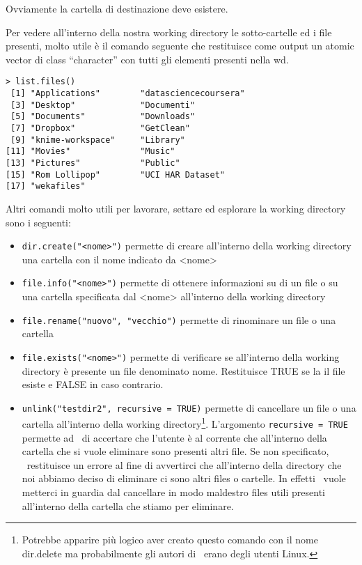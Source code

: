 Ovviamente la cartella di destinazione deve esistere.

Per vedere all'interno della nostra working directory le sotto-cartelle ed i file presenti, molto utile è il comando seguente che restituisce come output un atomic vector di class ``character'' con tutti gli elementi presenti nella wd.

\begin{lstlisting}
> list.files()
 [1] "Applications"        "datasciencecoursera"
 [3] "Desktop"             "Documenti"          
 [5] "Documents"           "Downloads"          
 [7] "Dropbox"             "GetClean"           
 [9] "knime-workspace"     "Library"            
[11] "Movies"              "Music"              
[13] "Pictures"            "Public"             
[15] "Rom Lollipop"        "UCI HAR Dataset"    
[17] "wekafiles"          
\end{lstlisting}


Altri comandi molto utili per lavorare, settare ed esplorare la working directory sono i seguenti:
\begin{itemize}

\item \lstinline!dir.create("<nome>")! permette di creare all'interno della working directory una cartella con il nome indicato da \textsf{<nome>}
\item \lstinline!file.info("<nome>")! permette di ottenere informazioni su di un file o su una cartella specificata dal \textsf{<nome>} all'interno della working directory
\item \lstinline!file.rename("nuovo", "vecchio")!  permette di rinominare un file o una cartella
\item \lstinline!file.exists("<nome>")! permette di verificare se all'interno della working directory è presente un file denominato \textsf{nome}. Restituisce \textsf{TRUE} se la il file esiste e \textsf{FALSE} in caso contrario.
\item \lstinline!unlink("testdir2", recursive = TRUE)! permette di cancellare un file o una cartella all'interno della working directory\footnote{Potrebbe apparire più logico aver creato questo comando con il nome \textsf{dir.delete} ma probabilmente gli autori di \erre\ erano degli utenti Linux.}. L'argomento \lstinline!recursive = TRUE! permette ad \erre\ di accertare che l'utente è al corrente che all'interno della cartella che si vuole eliminare sono presenti altri file. Se non specificato, \erre\ restituisce un errore al fine di avvertirci che all'interno della directory che noi abbiamo deciso di eliminare ci sono altri files o cartelle. In effetti \erre\ vuole metterci in guardia dal cancellare in modo maldestro files utili presenti all'interno della cartella che stiamo per eliminare.
\end{itemize}

